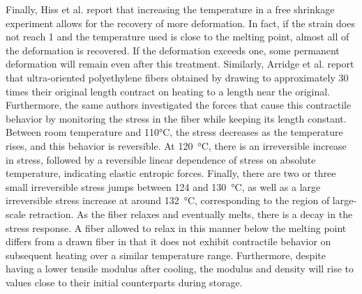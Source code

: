 Finally, Hiss et al. \citep{hissNetworkStretchingSlip1999} report that increasing the temperature in a free shrinkage experiment allows for the recovery of more deformation.
In fact, if the strain does not reach 1 and the temperature used is close to the melting point, almost all of the deformation is recovered.
If the deformation exceeds one, some permanent deformation will remain even after this treatment.
Similarly, Arridge et al. \citep{arridgeSelfhardeningHighlyOriented1977} report that ultra-oriented polyethylene fibers obtained by drawing to approximately 30 times their original length contract on heating to a length near the original.
Furthermore, the same authors investigated the forces that cause this contractile behavior by monitoring the stress in the fiber while keeping its length constant.
Between room temperature and 110°C, the stress decreases as the temperature rises, and this behavior is reversible.
At \SI{120}{\celsius}, there is an irreversible increase in stress, followed by a reversible linear dependence of stress on absolute temperature, indicating elastic entropic forces.
Finally, there are two or three small irreversible stress jumps between \num{124} and \SI{130}{\celsius}, as well as a large irreversible stress increase at around \SI{132}{\celsius}, corresponding to the region of large-scale retraction.
As the fiber relaxes and eventually melts, there is a decay in the stress response.
A fiber allowed to relax in this manner below the melting point differs from a drawn fiber in that it does not exhibit contractile behavior on subsequent heating over a similar temperature range.
Furthermore, despite having a lower tensile modulus after cooling, the modulus and density will rise to values close to their initial counterparts during storage.

%

